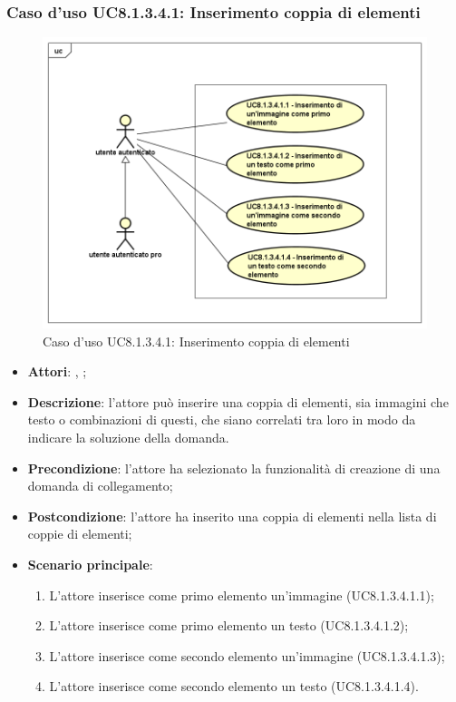 	\subsubsection{Caso d'uso UC8.1.3.4.1: Inserimento coppia di elementi}
	\label{UC8.1.3.4.1}
	\begin{figure}[h]
		\centering
		\includegraphics[scale=0.5,keepaspectratio]{UML/UC8_1_3_4_1.png}
		\caption{Caso d'uso UC8.1.3.4.1: Inserimento coppia di elementi}
	\end{figure}
	\FloatBarrier
	\begin{itemize}
		\item \textbf{Attori}: \uau, \uaupro;
		\item \textbf{Descrizione}: l'attore può inserire una coppia di elementi, sia immagini che testo o combinazioni di questi, che siano correlati tra loro in modo da indicare la soluzione della domanda. 
		\item \textbf{Precondizione}: l'attore ha selezionato la funzionalità di creazione di una domanda di collegamento;
		\item \textbf{Postcondizione}: l'attore ha inserito una coppia di elementi nella lista di coppie di elementi; 
		\item \textbf{Scenario principale}: 
		\begin{enumerate}
			\item L'attore inserisce come primo elemento un'immagine (UC8.1.3.4.1.1);
			\item L'attore inserisce come primo elemento un testo (UC8.1.3.4.1.2);
			\item L'attore inserisce come secondo elemento un'immagine (UC8.1.3.4.1.3);
			\item L'attore inserisce come secondo elemento un testo (UC8.1.3.4.1.4).	
		\end{enumerate}
	\end{itemize}
	
